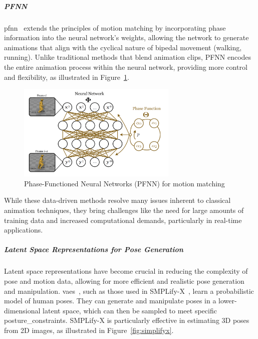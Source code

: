 \documentclass[../../main.tex]{subfiles}
\begin{document}
\subparagraph{{PFNN}}
\label{ch:background_work:sign_language_synthesis:3d_techniques:avatar_animation:deep_learning:pfnn}

\gls{pfnn}~\cite{10.1145/3072959.3073663} extends the principles of motion matching by incorporating phase information into the neural network’s weights, allowing the network to generate animations that align with the cyclical nature of bipedal movement (walking, running). Unlike traditional methods that blend animation clips, PFNN encodes the entire animation process within the neural network, providing more control and flexibility, as illustrated in Figure~\ref{fig:pfnn}.

\begin{figure}
  \centering \includegraphics[width = 3in]{chapters/background_work/images/pfnn.png}
  \caption{Phase-Functioned Neural Networks (PFNN) for motion matching}
  \label{fig:pfnn}
\end{figure}

While these data-driven methods resolve many issues inherent to classical animation techniques, they bring challenges like the need for large amounts of training data and increased computational demands, particularly in real-time applications.

\subparagraph{Latent Space Representations for Pose Generation}
\label{ch:background_work:sign_language_synthesis:3d_techniques:avatar_animation:deep_learning:latent_space}

Latent space representations have become crucial in reducing the complexity of pose and motion data, allowing for more efficient and realistic pose generation and manipulation. \gls{vae}s~\cite{kingma2013auto}, such as those used in SMPLify-X~\cite{pavlakos2019expressive}, learn a probabilistic model of human poses. They can generate and manipulate poses in a lower-dimensional latent space, which can then be sampled to meet specific \gls{posture_constraint}s. SMPLify-X is particularly effective in estimating 3D poses from 2D images, as illustrated in Figure~\ref{fig:simplifyx}.
\end{document}
